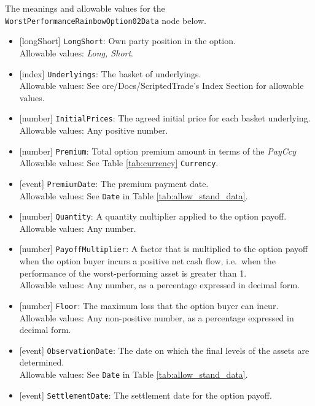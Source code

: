The meanings and allowable values for the \lstinline!WorstPerformanceRainbowOption02Data! node below.

\begin{itemize}
  \item{}[longShort] \lstinline!LongShort!: Own party position in the option. \\
  Allowable values: \emph{Long, Short}.
  \item{}[index] \lstinline!Underlyings!: The basket of underlyings. \\
  Allowable values: See ore/Docs/ScriptedTrade's Index Section for allowable values.
  \item{}[number] \lstinline!InitialPrices!: The agreed initial price for each basket underlying. \\
  Allowable values: Any positive number.
  \item{}[number] \lstinline!Premium!: Total option premium amount in terms of the \emph{PayCcy} \\
  Allowable values: See Table \ref{tab:currency} \lstinline!Currency!.
  \item{}[event] \lstinline!PremiumDate!: The premium payment date. \\
  Allowable values: See \lstinline!Date! in Table \ref{tab:allow_stand_data}.
  \item{}[number] \lstinline!Quantity!: A quantity multiplier applied to the option payoff. \\
  Allowable values: Any number.
  \item{}[number] \lstinline!PayoffMultiplier!: A factor that is multiplied to the option payoff when the option buyer incurs
  a positive net cash flow, i.e.\ when the performance of the worst-performing asset is greater than 1. \\
  Allowable values: Any number, as a percentage expressed in decimal form.
  \item{}[number] \lstinline!Floor!: The maximum loss that the option buyer can incur. \\
  Allowable values: Any non-positive number, as a percentage expressed in decimal form.
  \item{}[event] \lstinline!ObservationDate!: The date on which the final levels of the assets are determined. \\
  Allowable values: See \lstinline!Date! in Table \ref{tab:allow_stand_data}.
  \item{}[event] \lstinline!SettlementDate!: The settlement date for the option payoff. \\

\end{itemize}
